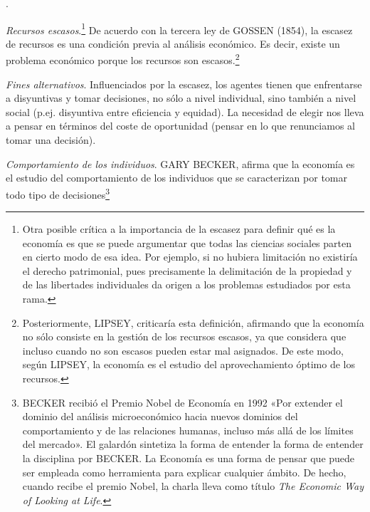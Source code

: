 \documentclass[10pt,a4paper]{article}
\newcounter{numitem}
\newenvironment{lnum}
      {\begin{list}{\arabic{numitem}.}{%
          \usecounter{numitem}%
          \setlength{\leftmargin}{1cm}%
          \setlength{\parskip}{3pt}%
          \setlength{\itemsep}{0pt}%
          \setlength{\parsep}{0pt}%
      }}
      {\end{list}}
\begin{document}
\begin{lnum}
    \item \textit{Recursos escasos}.\footnote{%
        Otra posible crítica a la importancia de la escasez para definir qué es la economía es que se puede argumentar que todas las ciencias sociales parten en cierto modo de esa idea. Por ejemplo, si no hubiera limitación no existiría el derecho patrimonial, pues precisamente la delimitación de la propiedad y de las libertades individuales da origen a los problemas estudiados por esta rama.
    } De acuerdo con la tercera ley de GOSSEN (1854), la escasez de recursos es una condición previa al análisis económico. Es decir, existe un problema económico porque los recursos son escasos.\footnote{%
        Posteriormente, LIPSEY, criticaría esta definición, afirmando que la economía no sólo consiste en la gestión de los recursos escasos, ya que considera que incluso cuando no son escasos pueden estar mal asignados. De este modo, según LIPSEY, la economía es el estudio del aprovechamiento óptimo de los recursos.
    }
    \item \textit{Fines alternativos}. Influenciados por la escasez, los agentes tienen que enfrentarse a disyuntivas y tomar decisiones, no sólo a nivel individual, sino también a nivel social (p.ej. disyuntiva entre eficiencia y equidad). La necesidad de elegir nos lleva a pensar en términos del coste de oportunidad (pensar en lo que renunciamos al tomar una decisión).
    \item \textit{Comportamiento de los individuos}. GARY BECKER, afirma que la economía es el estudio del comportamiento de los individuos que se caracterizan por tomar todo tipo de decisiones\footnote{%
        BECKER recibió el Premio Nobel de Economía en 1992 «Por extender el dominio del análisis microeconómico hacia nuevos dominios del comportamiento y de las relaciones humanas, incluso más allá de los límites del mercado». El galardón sintetiza la forma de entender la forma de entender la disciplina por BECKER. La Economía es una forma de pensar que puede ser empleada como herramienta para explicar cualquier ámbito. De hecho, cuando recibe el premio Nobel, la charla lleva como título \textit{The Economic Way of Looking at Life}. 
    
}
\end{lnum}
\end{document}
